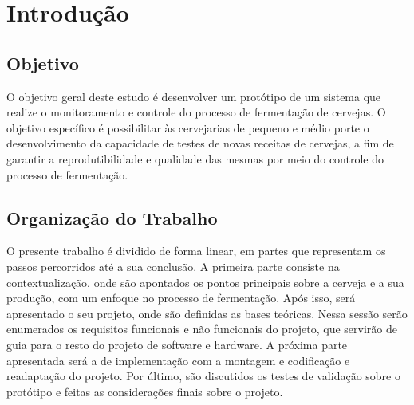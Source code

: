 \chapter{Introdução}

\section{Objetivo}

O objetivo geral deste estudo é desenvolver um protótipo de um sistema que realize o monitoramento e controle do processo de fermentação de cervejas.
O objetivo específico é possibilitar às cervejarias de pequeno e médio porte o desenvolvimento da capacidade de testes de novas receitas de cervejas, 
a fim de garantir a reprodutibilidade e qualidade das mesmas por meio do controle do processo de fermentação.


\section{Organização do Trabalho}


O presente trabalho é dividido de forma linear, em partes que representam os passos percorridos até a sua conclusão. A primeira parte consiste na contextualização, onde são apontados os pontos principais sobre a cerveja e a sua produção, com um enfoque no processo de fermentação. Após isso, será apresentado o seu projeto, onde são definidas as bases teóricas. Nessa sessão serão enumerados os requisitos funcionais e não funcionais do projeto, que servirão de guia para o resto do projeto de software e hardware. A próxima parte apresentada será a de implementação com a montagem e codificação e readaptação do projeto. Por último, são discutidos os testes de validação sobre o protótipo e feitas as considerações finais sobre o projeto.

